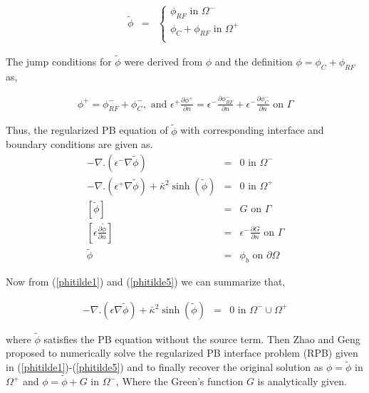 \begin{eqnarray}
	\tilde{ \phi} &=& \begin{cases}
	\phi_{RF} \text{ in } \Omega^-\\
	\phi_C + \phi_{RF} \text{ in } \Omega^+\\
	\end{cases}
\end{eqnarray}
 
The jump conditions for $\tilde\phi $ were derived from $\phi$ and the definition $\phi=\phi_C+\phi_{RF}$ as,

\begin{eqnarray}
\phi^+=\phi^-_{RF}+\phi^-_C,\text{  and  } \epsilon^+ \frac{\partial \phi^+}{\partial n}=\epsilon^- \frac{\partial \phi^-_{RF}}{\partial n}+\epsilon^- \frac{\partial \phi^-_C}{\partial n} \text{ on } \Gamma
\end{eqnarray}

Thus, the regularized PB equation of $\tilde \phi$ with corresponding interface and boundary conditions are given as. 
\begin{eqnarray}
	-\nabla.(\epsilon^- \nabla \tilde{ \phi}) &=& 0 \text{ in } \Omega^-\\ \label{phitilde1}
	-\nabla.(\epsilon^+ \nabla \tilde{ \phi}) +\bar\kappa^2 \sinh(\tilde{ \phi})&=& 0 \text{ in } \Omega^+\\\label{phitilde2}
	\left[\tilde{ \phi}\right] &=& G \text{ on } \Gamma \\ \label{phitilde3}
	\left[\epsilon\frac{\partial \tilde{ \phi}}{\partial n}\right]&=& \epsilon^-  \frac{\partial G}{\partial n} \text{ on } \Gamma\\\label{phitilde4}
	\tilde{\phi} &=& \phi_b \text{ on } \partial \Omega \label{phitilde5}
\end{eqnarray}	
	


Now from (\ref{phitilde1}) and (\ref{phitilde5}) we can summarize that, 

\begin{eqnarray}
	-\nabla . (\epsilon \nabla \tilde{ \phi}) +\bar\kappa^2 \sinh(\tilde{ \phi})&=& 0 \text{ in } \Omega^-\cup\Omega^+\label{RPB}
\end{eqnarray}
	 
where $\tilde \phi$	 satisfies the PB equation without the source term. Then Zhao and Geng \cite{Geng2017a} proposed to numerically solve the regularized PB interface problem (RPB) given in (\ref{phitilde1})-(\ref{phitilde5}) and to finally recover the original solution as $\phi= \tilde\phi $ in $\Omega^+$ and $\phi = \tilde \phi + G $ in $\Omega^-$, Where the Green's function $G$ is analytically given.


